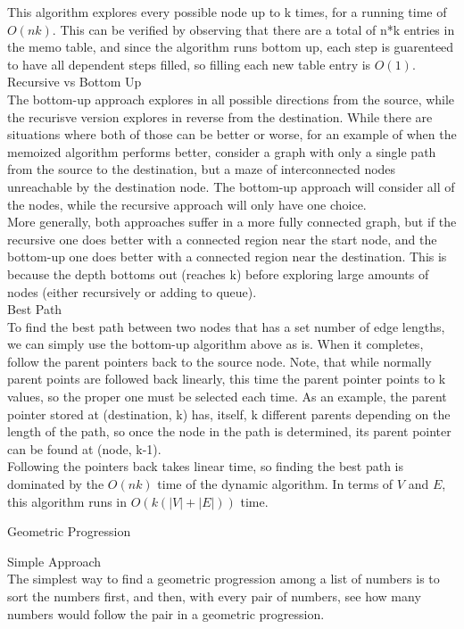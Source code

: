 \documentclass[12pt,twoside]{article}
\begin{document}
\begin{problems}
\begin{problemparts}
This algorithm explores every possible node up to k times, for a running time of $O(nk)$.  This can be verified by observing that there are a total of n*k entries in the memo table, and since the algorithm runs bottom up, each step is guarenteed to have all dependent steps filled, so filling each new table entry is $O(1)$.\\
  
\problempart Recursive vs Bottom Up\\
The bottom-up approach explores in all possible directions from the source, while the recurisve version explores in reverse from the destination.  While there are situations where both of those can be better or worse, for an example of when the memoized algorithm performs better, consider a graph with only a single path from the source to the destination, but a maze of interconnected nodes unreachable by the destination node.  The bottom-up approach will consider all of the nodes, while the recursive approach will only have one choice.  \\

More generally, both approaches suffer in a more fully connected graph, but if the recursive one does better with a connected region near the start node, and the bottom-up one does better with a connected region near the destination.  This is because the depth bottoms out (reaches k) before exploring large amounts of nodes (either recursively or adding to queue).\\

\problempart Best Path\\
To find the best path between two nodes that has a set number of edge lengths, we can simply use the bottom-up algorithm above as is.  When it completes, follow the parent pointers back to the source node.  Note, that while normally parent points are followed back linearly, this time the parent pointer points to k values, so the proper one must be selected each time.  As an example, the parent pointer stored at (destination, k) has, itself, k different parents depending on the length of the path, so once the node in the path is determined, its parent pointer can be found at (node, k-1).\\

Following the pointers back takes linear time, so finding the best path is dominated by the $O(nk)$ time of the dynamic algorithm.  In terms of $V$ and $E$, this algorithm runs in $O(k(|V|+|E|))$ time.\\
\end{problemparts}
\problem Geometric Progression
\begin{problemparts}
\problempart Simple Approach\\
The simplest way to find a geometric progression among a list of numbers is to sort the numbers first, and then, with every pair of numbers, see how many numbers would follow the pair in a geometric progression.\\


\end{problemparts}
\end{problems}
\end{document}
